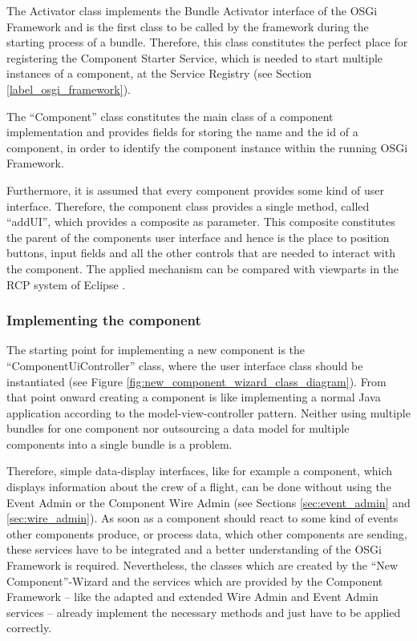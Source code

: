 The Activator class implements the Bundle Activator interface of the OSGi
Framework and is the first class to be called by the framework during the
starting process of a bundle. Therefore, this class constitutes the perfect
place for registering the Component Starter Service, which is needed to start multiple instances of
a component, at the Service Registry (see Section \ref{label_osgi_framework}).

The ``Component'' class constitutes the main class of a component
implementation and provides fields for storing the name and the id of a
component, in order to identify the component instance within the running OSGi
Framework.

Furthermore, it is assumed that every component provides some
kind of user interface. Therefore, the component class provides a single
method, called ``addUI'', which provides a composite as parameter. This composite
constitutes the parent of the components user interface and hence is the place
to position buttons, input fields and all the other controls that are needed
to interact with the component. The applied mechanism can be compared with
viewparts in the RCP system of Eclipse \cite{eclipse_rcp}.

\subsubsection{Implementing the component}
\label{sec:component_implementation}
The starting point for implementing a new component is the
``ComponentUiController'' class, where the user interface class should be
instantiated (see Figure \ref{fig:new_component_wizard_class_diagram}). From that point onward
creating a component is like implementing a normal Java application according to the model-view-controller pattern.
Neither using multiple bundles for one component nor outsourcing a data model
for multiple components into a single bundle is a problem.

Therefore, simple data-display interfaces, like for example a component, which displays information
about the crew of a flight, can be done without using the Event Admin or the Component Wire Admin
(see Sections \ref{sec:event_admin} and \ref{sec:wire_admin}). As soon as a component
should react to some kind of events other components produce, or process data, which other
components are sending, these services have to be integrated and a better understanding of the OSGi
Framework is required. Nevertheless, the classes which are created by the ``New Component''-Wizard
and the services which are provided by the Component Framework -- like the adapted and extended
Wire Admin and Event Admin services -- already implement the necessary methods and just have to be
applied correctly.
